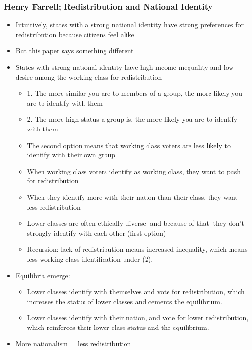 \documentclass[11pt]{article}
\begin{document}
\subsubsection{Henry Farrell; Redistribution and National Identity}
\label{sec:orgeeacdb4}
\begin{itemize}
\item Intuitively, states with a strong national identity have strong preferences
for redistribution because citizens feel alike
\item But this paper says something different
\item States with strong national identity have high income inequality and low
desire among the working class for redistribution
\begin{itemize}
\item 1. The more similar you are to members of a group, the more likely you are to
identify with them
\item 2. The more high status a group is, the more likely you are to identify with
them
\item The second option means that working class voters are less likely to
identify with their own group
\item When working class voters identify as working class, they want to push for
redistribution
\item When they identify more with their nation than their class, they want less
redistribution
\item Lower classes are often ethically diverse, and because of that, they don't
strongly identify with each other (first option)
\item Recursion: lack of redistribution means increased inequality, which means
less working class identification under (2).
\end{itemize}
\item Equilibria emerge:
\begin{itemize}
\item Lower classes identify with themselves and vote for redistribution, which
increases the status of lower classes and cements the equilibrium.
\item Lower classes identify with their nation, and vote for lower redistribution,
which reinforces their lower class status and the equilibrium.
\end{itemize}
\item More nationalism = less redistribution
\end{itemize}
\end{document}
